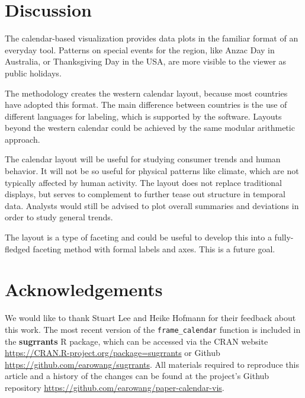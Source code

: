 \documentclass[12pt]{article}
\begin{document}
\hypertarget{sec:discussion}{%
\section{Discussion}\label{sec:discussion}}

The calendar-based visualization provides data plots in the familiar format of an everyday tool. Patterns on special events for the region, like Anzac Day in Australia, or Thanksgiving Day in the USA, are more visible to the viewer as public holidays.

The methodology creates the western calendar layout, because most countries have adopted this format. The main difference between countries is the use of different languages for labeling, which is supported by the software. Layouts beyond the western calendar could be achieved by the same modular arithmetic approach.

The calendar layout will be useful for studying consumer trends and human behavior. It will not be so useful for physical patterns like climate, which are not typically affected by human activity. The layout does not replace traditional displays, but serves to complement to further tease out structure in temporal data. Analysts would still be advised to plot overall summaries and deviations in order to study general trends.

The layout is a type of faceting and could be useful to develop this into a fully-fledged faceting method with formal labels and axes. This is a future goal.

\hypertarget{acknowledgements}{%
\section*{Acknowledgements}\label{acknowledgements}}

We would like to thank Stuart Lee and Heike Hofmann for their feedback about this work. The most recent version of the \texttt{frame\_calendar} function is included in the \textbf{sugrrants} R package, which can be accessed via the CRAN website \url{https://CRAN.R-project.org/package=sugrrants} or Github \url{https://github.com/earowang/sugrrants}. All materials required to reproduce this article and a history of the changes can be found at the project's Github repository \url{https://github.com/earowang/paper-calendar-vis}.



\end{document}
